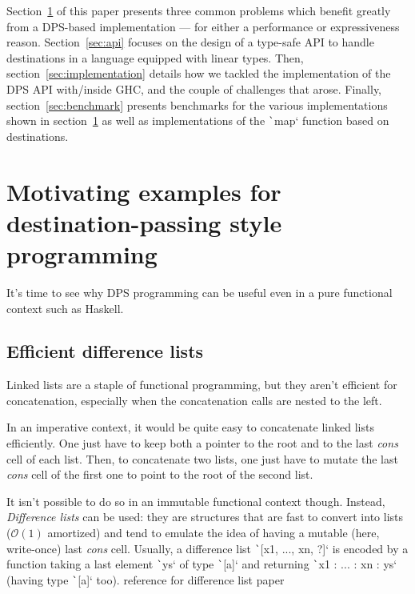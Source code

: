 \documentclass[english]{jflart}
\newcommand{\TODO}[1]{{\color{red}\large #1}}
\begin{document}
Section~\ref{sec:motivating-examples} of this paper presents three common problems which benefit greatly from a DPS-based implementation --- for either a performance or expressiveness reason. Section~\ref{sec:api} focuses on the design of a type-safe API to handle destinations in a language equipped with linear types. Then, section~\ref{sec:implementation} details how we tackled the implementation of the DPS API with/inside GHC, and the couple of challenges that arose. Finally, section~\ref{sec:benchmark} presents benchmarks for the various implementations shown in section~\ref{sec:motivating-examples} as well as implementations of the \texttt`map` function based on destinations.


\section{Motivating examples for destination-passing style programming}\label{sec:motivating-examples}





It's time to see why DPS programming can be useful even in a pure functional context such as Haskell.

\subsection{Efficient difference lists}

Linked lists are a staple of functional programming, but they aren't efficient for concatenation, especially when the concatenation calls are nested to the left.

In an imperative context, it would be quite easy to concatenate linked lists efficiently. One just have to keep both a pointer to the root and to the last \emph{cons} cell of each list. Then, to concatenate two lists, one just have to mutate the last \emph{cons} cell of the first one to point to the root of the second list.

It isn't possible to do so in an immutable functional context though. Instead, \emph{Difference lists} can be used: they are structures that are fast to convert into lists ($\mathcal{O}(1)$ amortized) and tend to emulate the idea of having a mutable (here, write-once) last \emph{cons} cell. Usually, a difference list \texttt`[x1, ..., xn, ?]` is encoded by a function taking a last element \texttt`ys` of type \texttt`[a]` and returning \texttt`x1 : ... : xn : ys` (having type \texttt`[a]` too). \TODO{reference for difference list paper}
\end{document}
